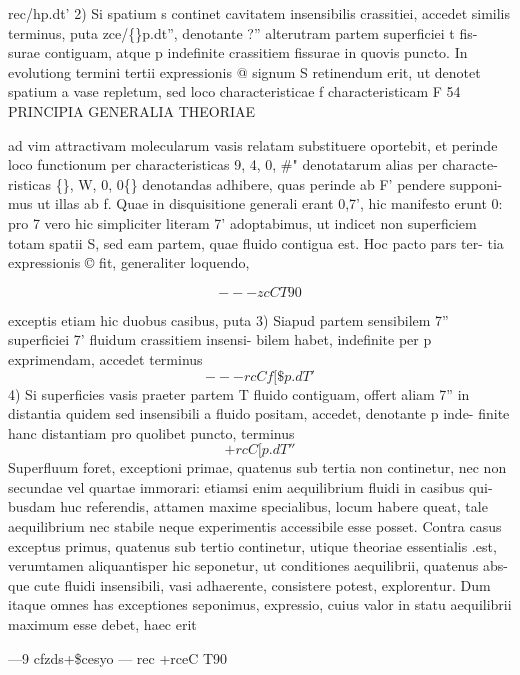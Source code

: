 \documentclass[12pt,a4paper]{article}
\begin{document}
rec/hp.dt'
2) Si spatium      s continet cavitatem insensibilis crassitiei, accedet similis
terminus, puta zce/\textregistered\{\}p.dt'',             denotante         ?'' alterutram partem superficiei t fis-
surae contiguam, atque p indefinite crassitiem fissurae in quovis puncto.
In evolutiong termini tertii expressionis @ signum S retinendum erit, ut
denotet spatium a vase repletum, sed loco characteristicae f characteristicam F
54                           PRINCIPIA    GENERALIA    THEORIAE


ad vim attractivam molecularum vasis relatam substituere oportebit, et perinde
loco functionum per characteristicas 9, 4, 0, \#" denotatarum alias per characte-
risticas \textregistered\{\}, W, 0, 0\textdegree\{\} denotandas adhibere, quas perinde ab F' pendere supponi-
mus ut illas ab f. Quae in disquisitione generali erant 0,7', hic manifesto erunt
0: pro 7 vero hic simpliciter literam 7' adoptabimus, ut indicet non superficiem
totam spatii S, sed eam partem, quae fluido contigua est. Hoc pacto pars ter-
tia expressionis   © fit, generaliter loquendo,

\[                                      ---    zcCT90\]

exceptis etiam hic duobus casibus, puta
3) Siapud partem sensibilem 7'' superficiei                7' fluidum crassitiem insensi-
bilem habet, indefinite per p exprimendam, accedet terminus
\[                                     ---rcCf[\$p.dT'\]
4) Si superficies vasis praeter partem         T fluido contiguam, offert aliam 7''
in distantia quidem sed insensibili a fluido positam, accedet, denotante p inde-
finite hanc distantiam pro quolibet puncto, terminus
\[                                     +rcC[p.dT''\]
Superfluum foret, exceptioni primae, quatenus sub tertia non continetur, nec non
secundae vel quartae immorari:       etiamsi enim aequilibrium fluidi in casibus qui-
busdam huc referendis,     attamen    maxime     specialibus,        locum habere queat, tale
aequilibrium nec stabile neque experimentis accessibile esse posset.              Contra casus
exceptus primus, quatenus sub tertio continetur, utique theoriae essentialis .est,
verumtamen aliquantisper hic seponetur, ut conditiones aequilibrii, quatenus abs-
que cute fluidi insensibili, vasi adhaerente, consistere potest, explorentur.
Dum itaque omnes has exceptiones seponimus, expressio, cuius valor in
statu aequilibrii maximum esse debet, haec erit

---9 cfzds+\$cesyo           --- rec              +rceC T90
\end{document}
